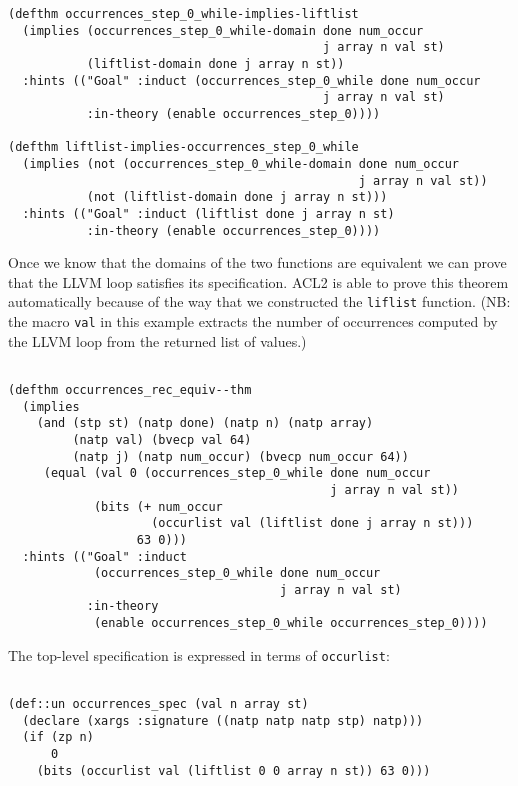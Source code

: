 \documentclass{eptcs}
\begin{document}
{\begin{verbatim}
(defthm occurrences_step_0_while-implies-liftlist
  (implies (occurrences_step_0_while-domain done num_occur
                                            j array n val st)
           (liftlist-domain done j array n st))
  :hints (("Goal" :induct (occurrences_step_0_while done num_occur
                                            j array n val st)
           :in-theory (enable occurrences_step_0))))

(defthm liftlist-implies-occurrences_step_0_while
  (implies (not (occurrences_step_0_while-domain done num_occur
                                                 j array n val st))
           (not (liftlist-domain done j array n st)))
  :hints (("Goal" :induct (liftlist done j array n st)
           :in-theory (enable occurrences_step_0))))

\end{verbatim}

Once we know that the domains of the two functions are equivalent we
can prove that the LLVM loop satisfies its specification.    ACL2
is able to prove this theorem automatically because of the way that we 
constructed the \texttt{liflist} function.  (NB: the macro
\texttt{val} in this example extracts the number of occurrences
computed by the LLVM loop from the returned list of values.)

\begin{verbatim}

(defthm occurrences_rec_equiv--thm
  (implies
    (and (stp st) (natp done) (natp n) (natp array)
         (natp val) (bvecp val 64)
         (natp j) (natp num_occur) (bvecp num_occur 64))
     (equal (val 0 (occurrences_step_0_while done num_occur
                                             j array n val st))
            (bits (+ num_occur
                    (occurlist val (liftlist done j array n st)))
                  63 0)))
  :hints (("Goal" :induct
            (occurrences_step_0_while done num_occur
                                      j array n val st)
           :in-theory
            (enable occurrences_step_0_while occurrences_step_0))))

\end{verbatim}

The top-level specification is expressed in terms of \texttt{occurlist}:

\begin{verbatim}

(def::un occurrences_spec (val n array st)
  (declare (xargs :signature ((natp natp natp stp) natp)))
  (if (zp n)
      0
    (bits (occurlist val (liftlist 0 0 array n st)) 63 0)))


\end{verbatim}}
\end{document}
